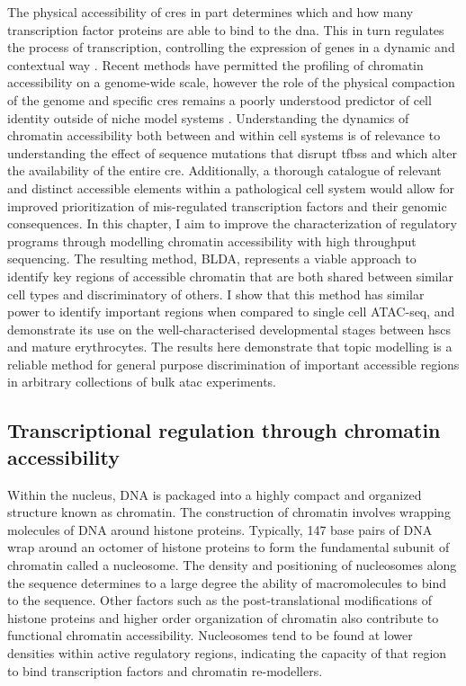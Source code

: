 The physical accessibility of \Glspl{cre} in part determines which and how many transcription factor proteins are able to bind to the \gls{dna}. This in turn regulates the process of transcription, controlling the expression of genes in a dynamic and contextual way \cite{Minnoye2021, Klemm}. Recent methods have permitted the profiling of chromatin accessibility on a genome-wide scale, however the role of the physical compaction of the genome and specific \glspl{cre} remains a poorly understood predictor of cell identity outside of niche model systems \cite{Schulz2019}. Understanding the dynamics of chromatin accessibility both between and within cell systems is of relevance to understanding the effect of sequence mutations that disrupt \glspl{tfbs} and which alter the availability of the entire \gls{cre}. Additionally, a thorough catalogue of relevant and distinct accessible elements within a pathological cell system would allow for improved prioritization of mis-regulated transcription factors and their genomic consequences. In this chapter, I aim to improve the characterization of regulatory programs through modelling chromatin accessibility with high throughput sequencing. The resulting method, BLDA, represents a viable approach to identify key regions of accessible chromatin that are both shared between similar cell types and discriminatory of others. I show that this method has similar power to identify important regions when compared to single cell ATAC-seq, and demonstrate its use on the well-characterised developmental stages between \glspl{hsc} and mature erythrocytes. The results here demonstrate that topic modelling is a reliable method for general purpose discrimination of important accessible regions in arbitrary collections of bulk \gls{atac} experiments.

\subsection{Transcriptional regulation through chromatin accessibility}

Within the nucleus, DNA is packaged into a highly compact and organized structure known as chromatin. The construction of chromatin involves wrapping molecules of DNA around histone proteins. Typically, 147 base pairs of DNA wrap around an octomer of histone proteins to form the fundamental subunit of chromatin called a nucleosome. The density and positioning of nucleosomes along the sequence determines to a large degree the ability of macromolecules to bind to the sequence. Other factors such as the post-translational modifications of histone proteins and higher order organization of chromatin also contribute to functional chromatin accessibility. Nucleosomes tend to be found at lower densities within active regulatory regions, indicating the capacity of that region to bind transcription factors and chromatin re-modellers. 

